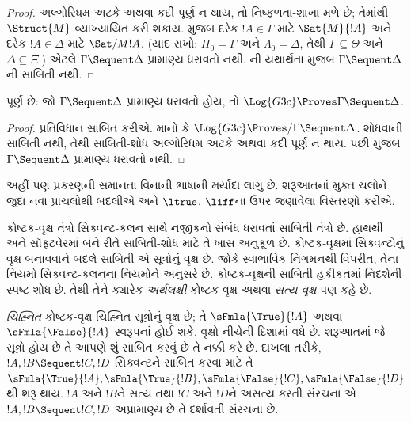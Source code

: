 \begin{proof}
  અલ્ગોરિધમ
  અટકે અથવા
  કદી પૂર્ણ ન
  થાય, તો
  નિષ્ફળતા-શાખા
  મળે છે;
  તેમાંથી
  $\Struct{M}$
  વ્યાખ્યાયિત
  કરી શકાય.
  મુજબ દરેક
  $!A \in \Gamma$
  માટે
  $\Sat{M}{!A}$
  અને દરેક
  $!A \in \Delta$
  માટે
  $\Sat/{M}{!A}$.
  (યાદ રાખો:
  $\Pi_0 = \Gamma$
  અને
  $\Lambda_0 =
  \Delta$,
  તેથી
  $\Gamma \subseteq \Theta$
  અને
  $\Delta \subseteq \Xi$.)
  એટલે
  $\Gamma \Sequent \Delta$
  પ્રામાણ્ય ધરાવતો નથી.
  ની
  યથાર્થતા મુજબ
  $\Gamma \Sequent \Delta$ની
  સાબિતી
  નથી.
\end{proof}

\begin{cor}
પૂર્ણ છે: જો
$\Gamma \Sequent \Delta$
પ્રામાણ્ય ધરાવતો હોય, તો
$\Log{G3c} \Proves \Gamma \Sequent \Delta$.
\end{cor}

\begin{proof}
  પ્રતિવિધાન
  સાબિત કરીએ.
  માનો કે
  $\Log{G3c} \Proves/ \Gamma
  \Sequent \Delta$.
  શોધવાની
  સાબિતી
  નથી, તેથી
  સાબિતી-શોધ
  અલ્ગોરિધમ
  અટકે અથવા
  કદી પૂર્ણ ન
  થાય. પછી
  મુજબ
  $\Gamma \Sequent \Delta$
  પ્રામાણ્ય ધરાવતો નથી.
\end{proof}
\endgroup

\begingroup
\makeatletter{}\makeatother


\label{guunit:OLP-0684}


અહીં પણ પ્રકરણની સમાનતા વિનાની ભાષાની મર્યાદા
લાગુ છે. શરૂઆતનાં મુક્ત ચલોને જુદા નવા પ્રાચલોથી
બદલીએ અને $\ltrue$, $\liff$ના ઉપર જણાવેલા
વિસ્તરણો કરીએ.

કોષ્ટક-વૃક્ષ તંત્રો સિક્વન્ટ-કલન સાથે નજીકનો સંબંધ ધરાવતાં
સાબિતી તંત્રો છે. હાથથી અને સૉફ્ટવેરમાં બંને રીતે
સાબિતી-શોધ માટે તે ખાસ અનુકૂળ છે. કોષ્ટક-વૃક્ષમાં
સિક્વન્ટોનું વૃક્ષ બનાવવાને બદલે સાબિતી એ
સૂત્રોનું વૃક્ષ છે. જોકે સ્વાભાવિક નિગમનથી
વિપરીત, તેના નિયમો સિક્વન્ટ-કલનના નિયમોને અનુસરે છે.
કોષ્ટક-વૃક્ષની સાબિતી હકીકતમાં નિદર્શની સ્પષ્ટ શોધ
છે. તેથી તેને ક્યારેક \emph{અર્થલક્ષી} કોષ્ટક-વૃક્ષ
અથવા \emph{સત્ય-વૃક્ષ} પણ કહે છે.

\emph{ચિહ્નિત} કોષ્ટક-વૃક્ષ ચિહ્નિત સૂત્રોનું
વૃક્ષ છે; તે $\sFmla{\True}{!A}$ અથવા
$\sFmla{\False}{!A}$ સ્વરૂપનાં હોઈ શકે.
વૃક્ષો નીચેની દિશામાં વધે છે. શરૂઆતમાં જે
સૂત્રો હોય છે તે આપણે શું સાબિત કરવું છે
તે નક્કી કરે છે. દાખલા તરીકે,
$!A, !B \Sequent !C, !D$ સિક્વન્ટને સાબિત
કરવા માટે તે
$\sFmla{\True}{!A}, \sFmla{\True}{!B},
\sFmla{\False}{!C}, \sFmla{\False}{!D}$થી
શરૂ થાય.
$!A$ અને $!B$ને સત્ય તથા $!C$ અને $!D$ને
અસત્ય કરતી સંરચના એ
$!A, !B \Sequent !C, !D$ અપ્રામાણ્ય છે તે
દર્શાવતી સંરચના છે.

